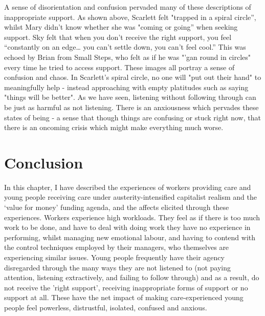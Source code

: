 A sense of disorientation and confusion pervaded many of these descriptions of inappropriate support. As shown above, Scarlett felt "trapped in a spiral circle”, whilst Mary didn’t know whether she was "coming or going” when seeking support. Sky felt that when you don’t receive the right support, you feel “constantly on an edge… you can’t settle down, you can’t feel cool.” This was echoed by Brian from Small Steps, who felt as if he was "'gan round in circles" every time he tried to access support. These images all portray a sense of confusion and chaos. In Scarlett's spiral circle, no one will "put out their hand" to meaningfully help - instead approaching with empty platitudes such as saying "things will be better". As we have seen, listening without following through can be just as harmful as not listening. There is an anxiousness which pervades these states of being - a sense that though things are confusing or stuck right now, that there is an oncoming crisis which might make everything much worse. 

\section{Conclusion}
In this chapter, I have described the experiences of workers providing care and young people receiving care under austerity-intensified capitalist realism and the `value for money' funding agenda, and the affects elicited through these experiences. Workers experience high workloads. They feel as if there is too much work to be done, and have to deal with doing work they have no experience in performing, whilst managing new emotional labour, and having to contend with the control techniques employed by their managers, who themselves are experiencing  similar issues. Young people frequently have their agency disregarded through the many ways they are not listened to (not paying attention, listening extractively, and failing to follow through) and as a result, do not receive the 'right support', receiving inappropriate forms of support or no support at all. These have the net impact of making care-experienced young people feel powerless, distrustful, isolated, confused and anxious. 

